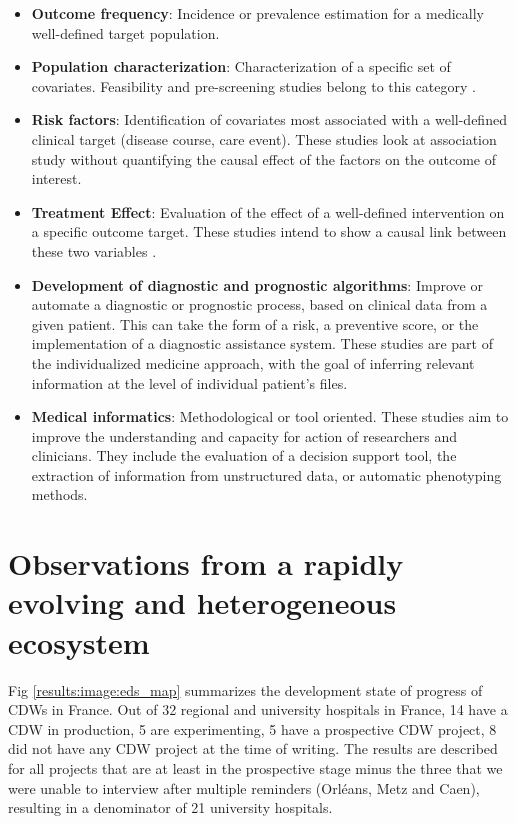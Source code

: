 \documentclass[french,12pt,twoside,a4paper]{book}
\begin{document}
\begin{itemize}
  \item \textbf{Outcome frequency}: Incidence or prevalence estimation for a
        medically well-defined target population.
  \item \textbf{Population characterization}: Characterization of a specific set
        of covariates. Feasibility and pre-screening studies belong to this category \citep{pasco_pre-screening_2019}.
  \item \textbf{Risk factors}: Identification of covariates most associated with
        a well-defined clinical target (disease course, care event). These
        studies look at  association study without quantifying the causal effect
        of the factors on the outcome of interest.
  \item \textbf{Treatment Effect}: Evaluation of the effect of a well-defined
        intervention on a specific outcome target. These studies intend to show
        a causal link between these two variables \citep{hernan_methods_2021}.
  \item \textbf{Development of diagnostic and prognostic algorithms}: Improve or automate a
        diagnostic or prognostic process, based on clinical data from a given
        patient. This can take the form of a risk, a preventive score, or the
        implementation of a diagnostic assistance system. These studies are part
        of the individualized medicine approach, with the goal of inferring
        relevant information at the level of individual patient's files.
  \item \textbf{Medical informatics}: Methodological or tool oriented. These
        studies aim to improve the understanding and capacity for action of
        researchers and clinicians. They include the evaluation
        of a decision support tool, the extraction of information from
        unstructured data, or automatic phenotyping methods.
\end{itemize}


\section{Observations from a rapidly evolving and heterogeneous ecosystem}%
\label{sec:cdw:results}

Fig \ref{results:image:eds_map} summarizes the development state of progress
of CDWs in France. Out of 32 regional and university hospitals in France, 14
have a CDW in production, 5 are experimenting, 5 have a prospective CDW
project, 8 did not have any CDW project at the time of writing. The results
are described for all projects that are at least in the prospective stage
minus the three that we were unable to interview after multiple reminders
(Orléans, Metz and Caen), resulting in a denominator of 21 university
hospitals.
\end{document}
